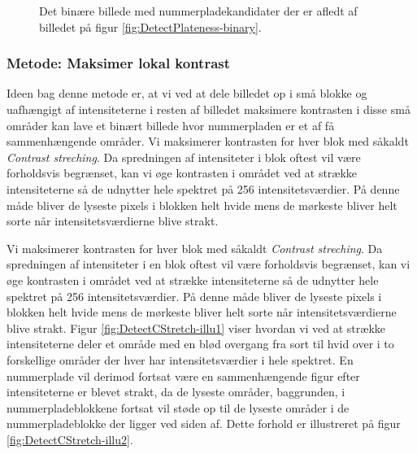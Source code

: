 \begin{figure}[htp]
  \centering
  \caption{Det binære billede med nummerpladekandidater der er afledt af billedet på figur \vref{fig:DetectPlateness-binary}.}
  \label{fig:DetectPlateness-binary}
\end{figure}

\subsubsection{Metode: Maksimer lokal kontrast}
Ideen bag denne metode er, at vi ved at dele billedet op i små blokke og uafhængigt af intensiteterne i resten af billedet maksimere kontrasten i disse små områder kan lave et binært billede hvor nummerpladen er et af få sammenhængende områder. Vi maksimerer kontrasten for hver blok med såkaldt \textit{Contrast streching}. Da spredningen af intensiteter i blok oftest vil være forholdsvis begrænset, kan vi øge kontrasten i området ved at strække intensiteterne så de udnytter hele spektret på 256 intensitetsværdier. På denne måde bliver de lyseste pixels i blokken helt hvide  mens de mørkeste bliver helt sorte når intensitetsværdierne blive strakt.   

Vi maksimerer kontrasten for hver blok med såkaldt \textit{Contrast streching}. Da spredningen af intensiteter i en blok oftest vil være forholdsvis begrænset, kan vi øge kontrasten i området ved at strække intensiteterne så de udnytter hele spektret på 256 intensitetsværdier. På denne måde bliver de lyseste pixels i blokken helt hvide  mens de mørkeste bliver helt sorte når intensitetsværdierne blive strakt. Figur \vref{fig:DetectCStretch-illu1} viser hvordan vi ved at strække intensiteterne deler et område med en blød overgang fra sort til hvid over i to forskellige områder der hver har intensitetsværdier i hele spektret. En nummerplade vil derimod fortsat være en sammenhængende figur efter intensiteterne er blevet strakt, da de lyseste områder, baggrunden, i nummerpladeblokkene fortsat vil støde op til de lyseste områder i de nummerpladeblokke der ligger ved siden af. Dette forhold er illustreret på figur \vref{fig:DetectCStretch-illu2}.


